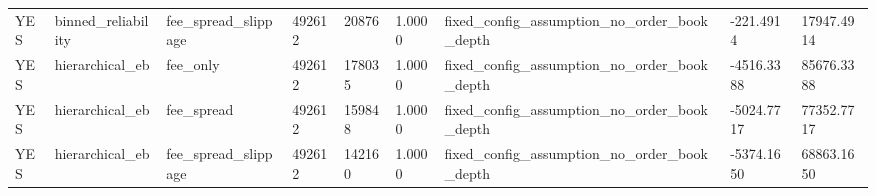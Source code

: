 \begin{tabular}{lllllllll}
YES & binned\_reliability & fee\_spread\_slippage & 492612 & 20876 & 1.0000 & fixed\_config\_assumption\_no\_order\_book\_depth & -221.4914 & 17947.4914 \\
YES & hierarchical\_eb & fee\_only & 492612 & 178035 & 1.0000 & fixed\_config\_assumption\_no\_order\_book\_depth & -4516.3388 & 85676.3388 \\
YES & hierarchical\_eb & fee\_spread & 492612 & 159848 & 1.0000 & fixed\_config\_assumption\_no\_order\_book\_depth & -5024.7717 & 77352.7717 \\
YES & hierarchical\_eb & fee\_spread\_slippage & 492612 & 142160 & 1.0000 & fixed\_config\_assumption\_no\_order\_book\_depth & -5374.1650 & 68863.1650 \\
\bottomrule
\end{tabular}
